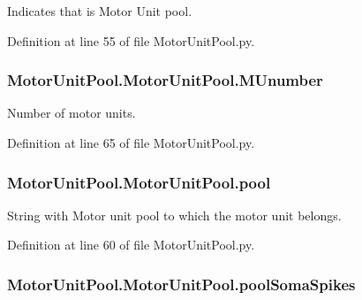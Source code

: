Indicates that is Motor Unit pool. 



Definition at line 55 of file Motor\-Unit\-Pool.\-py.

\hypertarget{class_motor_unit_pool_1_1_motor_unit_pool_aa5884530baaa20f46007805bc574407d}{
\subsubsection[{M\-Unumber}]{\setlength{\rightskip}{0pt plus 5cm}Motor\-Unit\-Pool.\-Motor\-Unit\-Pool.\-M\-Unumber}}\label{class_motor_unit_pool_1_1_motor_unit_pool_aa5884530baaa20f46007805bc574407d}


Number of motor units. 



Definition at line 65 of file Motor\-Unit\-Pool.\-py.

\hypertarget{class_motor_unit_pool_1_1_motor_unit_pool_a832364dc014aa8a1b2947abfe063f626}{
\subsubsection[{pool}]{\setlength{\rightskip}{0pt plus 5cm}Motor\-Unit\-Pool.\-Motor\-Unit\-Pool.\-pool}}\label{class_motor_unit_pool_1_1_motor_unit_pool_a832364dc014aa8a1b2947abfe063f626}


String with Motor unit pool to which the motor unit belongs. 



Definition at line 60 of file Motor\-Unit\-Pool.\-py.

\hypertarget{class_motor_unit_pool_1_1_motor_unit_pool_a3790757a111061662ad0f98120b25e69}{
\subsubsection[{pool\-Soma\-Spikes}]{\setlength{\rightskip}{0pt plus 5cm}Motor\-Unit\-Pool.\-Motor\-Unit\-Pool.\-pool\-Soma\-Spikes}}\label{class_motor_unit_pool_1_1_motor_unit_pool_a3790757a111061662ad0f98120b25e69}


